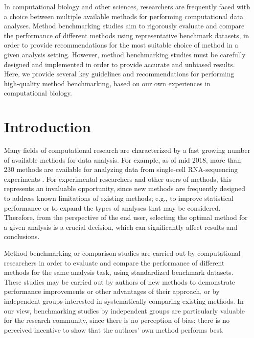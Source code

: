 \documentclass[12pt, a4paper]{article}
\begin{document}
In computational biology and other sciences, researchers are frequently faced with a choice between multiple available methods for performing computational data analyses. Method benchmarking studies aim to rigorously evaluate and compare the performance of different methods using representative benchmark datasets, in order to provide recommendations for the most suitable choice of method in a given analysis setting. However, method benchmarking studies must be carefully designed and implemented in order to provide accurate and unbiased results. Here, we provide several key guidelines and recommendations for performing high-quality method benchmarking, based on our own experiences in computational biology.




\section*{Introduction}

Many fields of computational research are characterized by a fast growing number of available methods for data analysis. For example, as of mid 2018, more than 230 methods are available for analyzing data from single-cell RNA-sequencing experiments \citep{Zappia2018}. For experimental researchers and other users of methods, this represents an invaluable opportunity, since new methods are frequently designed to address known limitations of existing methods; e.g., to improve statistical performance or to expand the types of analyses that may be considered. Therefore, from the perspective of the end user, selecting the optimal method for a given analysis is a crucial decision, which can significantly affect results and conclusions.

Method benchmarking or comparison studies are carried out by computational researchers in order to evaluate and compare the performance of different methods for the same analysis task, using standardized benchmark datasets. These studies may be carried out by authors of new methods to demonstrate performance improvements or other advantages of their approach, or by independent groups interested in systematically comparing existing methods. In our view, benchmarking studies by independent groups are particularly valuable for the research community, since there is no perception of bias: there is no perceived incentive to show that the authors' own method performs best.
\end{document}
